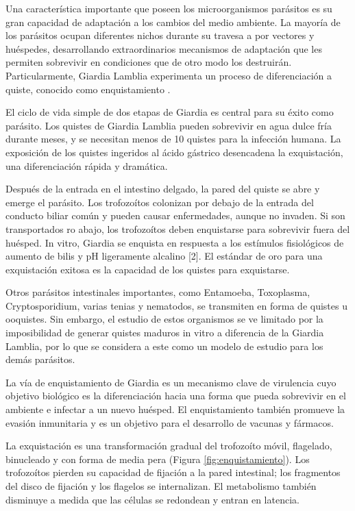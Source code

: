     Una característica importante que poseen los microorganismos parásitos es su gran capacidad de
    adaptación a los cambios del medio ambiente. La mayoría de los parásitos ocupan
    diferentes nichos durante su travesa a por vectores y huéspedes, desarrollando extraordinarios
    mecanismos de adaptación que les permiten sobrevivir en condiciones que de otro modo
    los destruirán. Particularmente, Giardia Lamblia experimenta un proceso de diferenciación
    a quiste, conocido como enquistamiento \cite{gda}.

    El ciclo de vida simple de dos etapas de Giardia es central para su éxito como parásito. Los
    quistes de Giardia Lamblia pueden sobrevivir en agua dulce fría durante meses, y se necesitan
    menos de 10 quistes para la infección humana. La exposición de los quistes ingeridos al ácido
    gástrico desencadena la exquistación, una diferenciación rápida y dramática.

    Después de la entrada en el intestino delgado, la pared del quiste se abre y emerge el
    parásito. Los trofozoítos colonizan por debajo de la entrada del conducto biliar común y pueden
    causar enfermedades, aunque no invaden. Si son transportados ro abajo, los trofozoítos
    deben enquistarse para sobrevivir fuera del huésped. In vitro, Giardia se enquista en respuesta a
    los estímulos fisiológicos de aumento de bilis y pH ligeramente alcalino [2]. El estándar
    de oro para una exquistación exitosa es la capacidad de los quistes para exquistarse.

    Otros parásitos intestinales importantes, como Entamoeba, Toxoplasma, Cryptosporidium, varias
    tenias y nematodos, se transmiten en forma de quistes u ooquistes. Sin embargo,
    el estudio de estos organismos se ve limitado por la imposibilidad de generar quistes maduros
    in vitro a diferencia de la Giardia Lamblia, por lo que se considera a este como un modelo
    de estudio para los demás parásitos.

    La vía de enquistamiento de Giardia es un mecanismo clave de virulencia cuyo objetivo
    biológico es la diferenciación hacia una forma que pueda sobrevivir en el ambiente e infectar
    a un nuevo huésped. El enquistamiento también promueve la evasión inmunitaria y es un
    objetivo para el desarrollo de vacunas y fármacos.

    La exquistación es una transformación gradual
    del trofozoíto móvil, flagelado, binucleado y con forma de media pera (Figura \ref{fig:enquistamiento}).
    Los trofozoítos pierden su capacidad de fijación a la pared intestinal; los fragmentos del disco de
    fijación y los flagelos se internalizan. El metabolismo también disminuye a medida que las células
    se redondean y entran en latencia.

